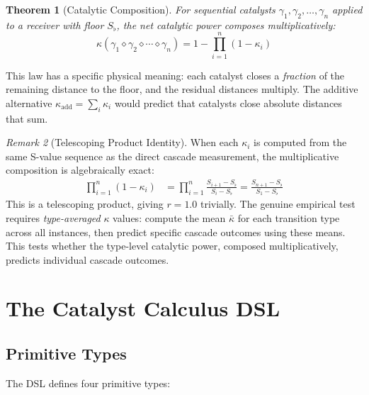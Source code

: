 \documentclass[11pt,a4paper]{article}
\newtheorem{theorem}{Theorem}[section]
\theoremstyle{definition}
\theoremstyle{remark}
\newtheorem{remark}[theorem]{Remark}
\newcommand{\Sfloor}{S_{\flat}}
\begin{document}
\begin{theorem}[Catalytic Composition]
\label{thm:composition}
For sequential catalysts $\gamma_1, \gamma_2, \ldots, \gamma_n$ applied to a receiver with floor $\Sfloor$, the net catalytic power composes multiplicatively:
\begin{equation}
\boxed{\kappa(\gamma_1 \diamond \gamma_2 \diamond \cdots \diamond \gamma_n) = 1 - \prod_{i=1}^{n} (1 - \kappa_i)}
\end{equation}
\end{theorem}

This law has a specific physical meaning: each catalyst closes a \emph{fraction} of the remaining distance to the floor, and the residual distances multiply. The additive alternative $\kappa_{\mathrm{add}} = \sum_i \kappa_i$ would predict that catalysts close absolute distances that sum.

\begin{remark}[Telescoping Product Identity]
\label{rem:telescoping}
When each $\kappa_i$ is computed from the same S-value sequence as the direct cascade measurement, the multiplicative composition is algebraically exact:
\begin{align}
\prod_{i=1}^{n} (1 - \kappa_i) &= \prod_{i=1}^{n} \frac{S_{i+1} - \Sfloor}{S_i - \Sfloor} = \frac{S_{n+1} - \Sfloor}{S_1 - \Sfloor}
\end{align}
This is a telescoping product, giving $r = 1.0$ trivially. The genuine empirical test requires \emph{type-averaged} $\kappa$ values: compute the mean $\bar{\kappa}$ for each transition type across all instances, then predict specific cascade outcomes using these means. This tests whether the type-level catalytic power, composed multiplicatively, predicts individual cascade outcomes.
\end{remark}

\section{The Catalyst Calculus DSL}
\label{sec:dsl}

\subsection{Primitive Types}

The DSL defines four primitive types:
\end{document}
